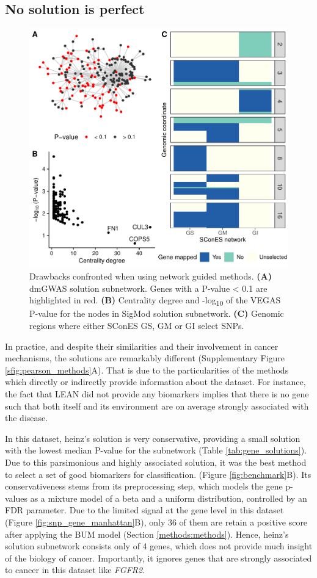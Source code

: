 \documentclass[twocolumn, 10pt]{article}
\begin{document}
\subsection{No solution is perfect}
\label{sec:orgc8f05c9}

\begin{figure}[htbp]
\centering
\includegraphics[width=.9\linewidth]{./figures/figure_2.pdf}
\caption{\label{fig:issues}
Drawbacks confronted when using network guided methods. \textbf{(A)} dmGWAS solution subnetwork. Genes with a P-value < 0.1 are highlighted in red. \textbf{(B)} Centrality degree and -log\textsubscript{10} of the VEGAS P-value for the nodes in SigMod solution subnetwork. \textbf{(C)} Genomic regions where either SConES GS, GM or GI select SNPs.}
\end{figure}

In practice, and despite their similarities and their involvement in cancer mechanisms, the solutions are remarkably different (Supplementary Figure \ref{sfig:pearson_methods}A). That is due to the particularities of the methods which directly or indirectly provide information about the dataset. For instance, the fact that LEAN did not provide any biomarkers implies that there is no gene such that both itself and its environment are on average strongly associated with the disease. 

In this dataset, heinz's solution is very conservative, providing a small solution with the lowest median P-value for the subnetwork (Table \ref{tab:gene_solutions}). Due to this parsimonious and highly associated solution, it was the best method to select a set of good biomarkers for classification. (Figure \ref{fig:benchmark}B). Its conservativeness stems from its preprocessing step, which models the gene p-values as a mixture model of a beta and a uniform distribution, controlled by an FDR parameter. Due to the limited signal at the gene level in this dataset (Figure \ref{fig:snp_gene_manhattan}B), only 36 of them are retain a positive score after applying the BUM model (Section \ref{methods:methods}). Hence, heinz's solution subnetwork consists only of 4 genes, which does not provide much insight of the biology of cancer. Importantly, it ignores genes that are strongly associated to cancer in this dataset like \emph{FGFR2}. 
\end{document}
